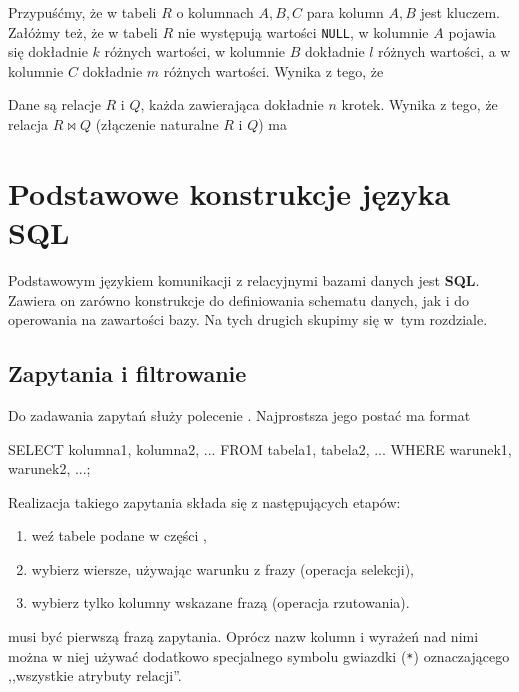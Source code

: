 \begin{problems}
    \prob Przypuśćmy, że w tabeli $R$ o kolumnach $A, B, C$ para kolumn $A, B$ jest kluczem. Załóżmy też, że w tabeli $R$ nie występują wartości \texttt{NULL}, w kolumnie $A$ pojawia się dokładnie $k$ różnych wartości, w kolumnie $B$ dokładnie $l$ różnych wartości, a w kolumnie $C$ dokładnie $m$ różnych wartości. Wynika z tego, że 

    \prob Dane są relacje $R$ i $Q$, każda zawierająca dokładnie $n$ krotek. Wynika z tego, że relacja $R\bowtie Q$ (złączenie naturalne $R$ i $Q$) ma
\end{problems}

\section{Podstawowe konstrukcje języka SQL}

Podstawowym językiem komunikacji z relacyjnymi bazami danych jest \textbf{SQL}. Zawiera on zarówno konstrukcje do definiowania schematu danych, jak i do operowania na zawartości bazy. Na tych drugich skupimy się w~tym rozdziale.

\subsection{Zapytania i filtrowanie} %

Do zadawania zapytań służy polecenie . Najprostsza jego postać ma format
\begin{sql}
    SELECT kolumna1, kolumna2, ...
    FROM tabela1, tabela2, ...
    WHERE warunek1, warunek2, ...;
\end{sql}

Realizacja takiego zapytania składa się z następujących etapów:
\begin{enumerate}
    \item weź tabele podane w części ,
    \item wybierz wiersze, używając warunku z frazy  (operacja selekcji),
    \item wybierz tylko kolumny wskazane frazą  (operacja rzutowania).
\end{enumerate}

 musi być pierwszą frazą zapytania. Oprócz nazw kolumn i wyrażeń nad nimi można w niej używać dodatkowo specjalnego symbolu gwiazdki (\texttt{*}) oznaczającego ,,wszystkie atrybuty relacji''.

